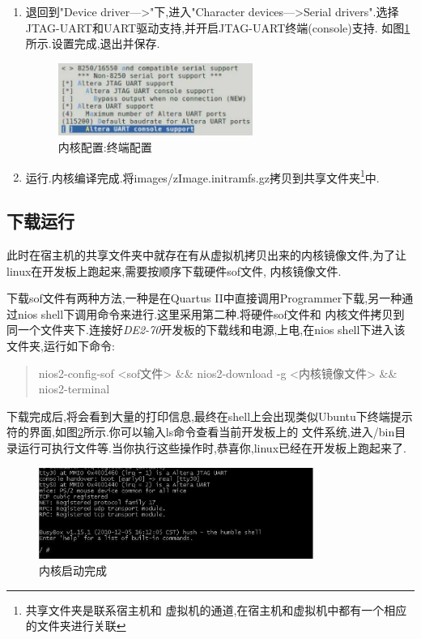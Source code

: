 \documentclass[12pt,a4paper,titlepage]{article}
\begin{document}
\begin{enumerate}
\item 退回到"Device driver--->"下,进入"Character devices--->Serial drivers".选择JTAG-UART和UART驱动支持,并开启JTAG-UART终端(console)支持.
如图\ref{f_kcfg_ct}所示.设置完成,退出并保存.
\begin{figure}[!bhtp]
\centering
\includegraphics[width=0.6\textwidth]{pic/f_kcfg_char_terminal.eps}
\caption{内核配置:终端配置\label{f_kcfg_ct}}
\end{figure}
\item 运行.内核编译完成.将images/zImage.initramfs.gz拷贝到共享文件夹\footnote{{共享文件夹是联系宿主机和
虚拟机的通道,在宿主机和虚拟机中都有一个相应的文件夹进行关联}}中.
\end{enumerate}
\subsection{下载运行}
此时在宿主机的共享文件夹中就存在有从虚拟机拷贝出来的内核镜像文件,为了让linux在开发板上跑起来,需要按顺序下载{硬件sof文件,
内核镜像文件}.

下载sof文件有两种方法,一种是在Quartus II中直接调用Programmer下载,另一种通过nios shell下调用命令来进行.这里采用第二种.将硬件sof文件和
内核文件拷贝到同一个文件夹下.连接好\textit{DE2-70}开发板的下载线和电源,上电,在nios shell下进入该文件夹,运行如下命令:
\begin{verse}
nios2-config-sof <sof文件> \&\& nios2-download -g <内核镜像文件> \&\& nios2-terminal
\end{verse}
下载完成后,将会看到大量的打印信息,最终在shell上会出现类似Ubuntu下终端提示符的界面,如图\ref{f_kb}所示.你可以输入ls命令查看当前开发板上的
文件系统,进入/bin目录运行可执行文件等.当你执行这些操作时,恭喜你,linux已经在开发板上跑起来了.
\begin{figure}[!bhtp]
\centering
\includegraphics[width=0.8\textwidth]{pic/f_kernel_bootingmsg.eps}
\caption{内核启动完成\label{f_kb}}
\end{figure}
\end{document}

